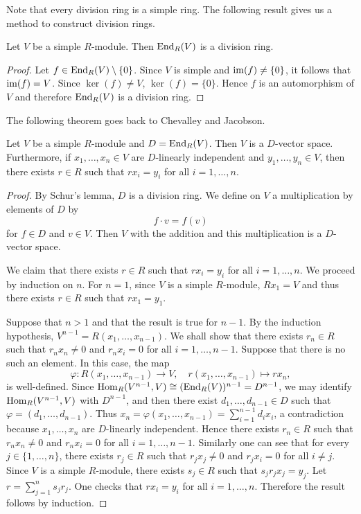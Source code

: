 Note that every division ring is a simple ring. The following result gives us a method to construct division rings.

\begin{lemma}[Schur]
Let $V$ be a simple $R$-module. Then $\operatorname{End}_R(V)$ is a division ring.
\end{lemma}

\begin{proof}
Let $f\in \operatorname{End}_R(V)\setminus \{ 0\}$. Since $V$ is simple and $\operatorname{im}(f)\neq\{0\}$, it follows that $\operatorname{im}(f)=V$. Since
$\ker(f)\neq V$, $\ker(f)=\{0\}$. Hence $f$ is an automorphism of $V$ and therefore $\operatorname{End}_R(V)$ is a division ring.
\end{proof}

The following theorem goes back to Chevalley and Jacobson.

\begin{theorem}
Let $V$ be a simple $R$-module and 
$D=\operatorname{End}_R(V)$. Then $V$ is a $D$-vector space. Furthermore, if $x_1,\dots,x_n\in V$ are $D$-linearly 
independent and $y_1,\dots,y_n\in V$, then there exists $r\in R$ such that $rx_i=y_i$ for all $i=1,\dots,n$.
\end{theorem}

\begin{proof}
By Schur's lemma, $D$ is a division ring.
We define on $V$ a multiplication by elements of $D$ by 
\[
f\cdot v=f(v)
\]
for $f\in D$ and $v\in V$. Then $V$ with the addition and this multiplication is a $D$-vector space.

We claim that there exists $r\in R$ such that $rx_i=y_i$ for all $i=1,\dots,n$. We proceed by induction on $n$.
For $n=1$, since $V$ is a simple $R$-module, $Rx_1=V$ and thus there exists $r\in R$ such that $rx_1=y_1$.

Suppose that $n>1$ and that the result is true for $n-1$.
By the induction hypothesis, $V^{n-1}=R(x_1,\dots,x_{n-1})$. We shall show that there exists $r_n\in R$ 
such that $r_nx_n\neq 0$ and $r_nx_i=0$ for all
$i=1,\dots,n-1$. Suppose that there is no such an element. In this case, 
the map 
\[
\varphi\colon R(x_1,\dots,x_{n-1})\rightarrow V,
\quad
r(x_1,\dots,x_{n-1})\mapsto rx_n, 
\]
is well-defined. Since $\operatorname{Hom}_R(V^{n-1}, V)\cong
(\operatorname{End}_R(V))^{n-1}=D^{n-1}$, we may identify
$\operatorname{Hom}_R(V^{n-1}, V)$ with $D^{n-1}$, and then there exist
$d_1,\dots,d_{n-1}\in D$ such that $\varphi =(d_1,\dots,d_{n-1})$. Thus
$x_n=\varphi (x_1,\dots,x_{n-1})=\sum_{i=1}^{n-1}d_ix_i$, a contradiction because $x_1,\dots,x_n$ are $D$-linearly independent. 
Hence there exists $r_n\in R$ such that $r_nx_n\neq 0$ and $r_nx_i=0$ for all
$i=1,\dots,n-1$. Similarly one can see that for every $j\in\{ 1,\dots,n\}$,
there exists $r_j\in R$ such that $r_jx_j\neq 0$ and $r_jx_i=0$ for all
$i\neq j$. Since  $V$ is a simple $R$-module, there exists $s_j\in R$
such that $s_jr_jx_j=y_j$. Let $r=\sum_{j=1}^ns_jr_j$. One checks that $rx_i=y_i$ for all $i=1,\dots,n$. Therefore the result follows by induction.
\end{proof}

